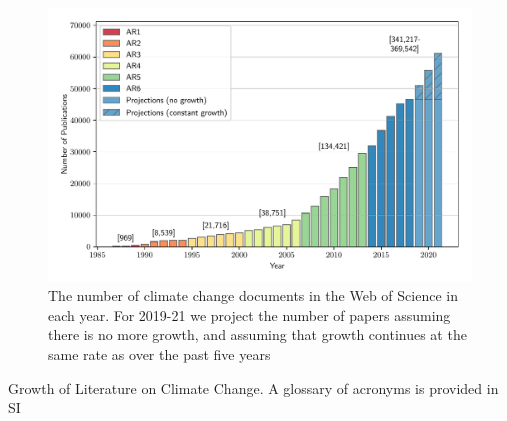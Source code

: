 \documentclass{article}
\begin{document}
\begin{linenumbers}
		\begin{figure}[htp]
			\begin{center}
				\includegraphics[width=180mm]{plots_pub/pubs_time_wgb.pdf}
				\caption{ The number of climate change documents in the Web of Science in each year. For 2019-21 we project the number of papers assuming there is no more growth, and assuming that growth continues at the same rate as over the past five years}
				\label{pub-growth}
			\end{center}
		\end{figure}
		
		
		\begin{table}[htp]
			\begin{center}
				{\scriptsize
					}
				\caption{Growth of Literature on Climate Change. A glossary of acronyms is provided in SI}
				\label{tab}
			\end{center}
		\end{table}
		

\end{linenumbers}
\end{document}
